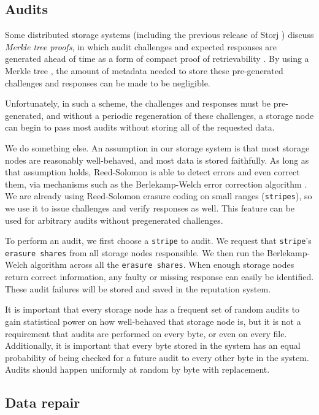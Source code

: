 \documentclass[a4paper,10pt]{article} \usepackage[utf8]{inputenc}
\newcommand{\x}[1]{{\tt #1}} \newcommand{\code}[1]{{\tt #1}}
\begin{document}
\subsection{Audits}

Some distributed storage systems (including the previous release of Storj
\cite{storj-v2}) discuss {\em Merkle tree proofs}, in which audit challenges
and expected responses are generated ahead of time as a form of compact
proof of retrievability \cite{proof-of-retrievability}. By using a Merkle tree
\cite{merkle-tree}, the amount of metadata needed to store these pre-generated
challenges and responses can be made to be negligible.

Unfortunately, in such a scheme, the challenges and responses must be
pre-generated, and without a periodic regeneration of these challenges, a
storage node can begin to pass most audits without storing all of the requested
data.

We do something else.
An assumption in our storage system is that most storage nodes are
reasonably well-behaved, and most data is stored faithfully. As long as that
assumption holds, Reed-Solomon is able to detect errors and even correct them,
via mechanisms such as the Berlekamp-Welch error correction algorithm \cite{bw}.
We are already using Reed-Solomon erasure coding
\cite{rs} on small ranges (\x{stripes}), so we use it to issue challenges and
verify responses as well.
This feature can be used for arbitrary audits without pregenerated challenges.

To perform an audit, we first choose a \x{stripe} to audit. We request that
\x{stripe}'s \x{erasure shares} from all storage nodes responsible. We then run
the Berlekamp-Welch algorithm \cite{bw} across all the \x{erasure shares}. When
enough storage nodes return correct information, any faulty or missing response
can easily be identified. These audit failures will be stored and saved in the
reputation system.

It is important that every storage node has a frequent set of random audits to
gain statistical power on how well-behaved that storage node is, but it is not
a requirement that audits are performed on every byte, or even on every file.
Additionally, it is important that every byte stored in the system has an equal
probability of being checked for a future audit to every other byte in the
system. Audits should happen uniformly at random by byte with replacement.

\subsection{Data repair}\label{sec:data_repair}
\end{document}
